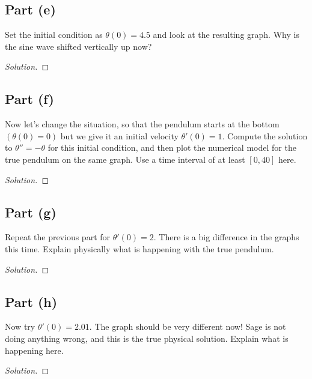 \documentclass[letterpaper, 12pt]{amsart}
\theoremstyle{definition}  							%
\begin{document}
		\subsection*{Part (e)}
		Set the initial condition as $\theta(0) = 4.5$ and look at the resulting graph. 
		Why is the sine wave shifted vertically up now?

		\begin{proof}[Solution]
		\end{proof}

		\subsection*{Part (f)}
		Now let’s change the situation, so that the pendulum starts at the bottom $(\theta(0) = 0)$ but we give it an initial velocity $\theta'(0) = 1$. 
		Compute the solution to $\theta'' = -\theta$ for this initial condition, and then plot the numerical model for the true pendulum on the same graph. 
		Use a time interval of at least $[0, 40]$ here.

		\begin{proof}[Solution]
		\end{proof}

		\subsection*{Part (g)}
		Repeat the previous part for $\theta'(0) = 2$. 
		There is a big difference in the graphs this time. 
		Explain physically what is happening with the true pendulum.

		\begin{proof}[Solution]
		\end{proof}

		\subsection*{Part (h)}
		Now try $\theta'(0) = 2.01$. 
		The graph should be very different now! 
		Sage is not doing anything wrong, and this is the true physical solution. 
		Explain what is happening here.

		\begin{proof}[Solution]
		\end{proof}

	\appendix
\end{document}

